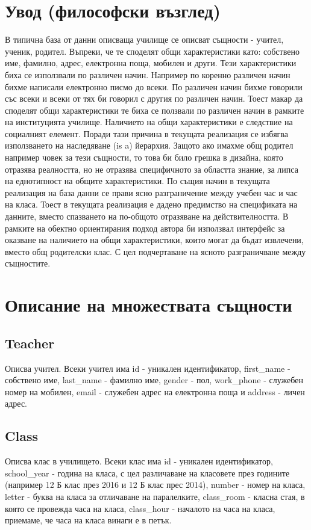 \documentclass[a4paper, 12pt, x11names]{article}
\begin{document}
\section{Увод (философски възглед)}
В типична база от данни описваща училище се описват същности - учител, ученик, родител.
Въпреки, че те споделят общи характеристики като: собствено име, фамилно, адрес, електронна поща, мобилен и други.
Тези характеристики биха се използвали по различен начин.
Например по коренно различен начин бихме написали електронно писмо до всеки.
По различен начин бихме говорили със всеки и всеки от тях би говорил с другия по различен начин.
Тоест макар да споделят общи характеристики те биха се ползвали по различен начин в рамките на институцията училище.
Наличието на общи характеристики е следствие на социалният елемент.
Поради тази причина в текущата реализация се избягва използването на наследяване (is a) йерархия.
Защото ако имахме общ родител например човек за тези същности, то това би било грешка в дизайна, която отразява реалността,
но не отразява специфичното за областта знание, за липса на еднотипност на общите характеристики.
По същия начин в текущата реализация на база данни се прави ясно разграничение между учебен час и час на класа.
Тоест в текущата реализация е дадено предимство на спецификата на данните,
вместо спазването на по-общото отразяване на действителността.
В рамките на обектно ориентирания подход автора би използвал интерфейс за оказване на наличието на общи характеристики,
които могат да бъдат извлечени, вместо общ родителски клас. С цел подчертаване на ясното разграничване между същностите.
\section{Описание на множествата същности}
\subsection{Teacher}
Описва учител. Всеки учител има id - уникален идентификатор,
first\_name - собствено име, last\_name - фамилно име,
gender - пол, work\_phone - служебен номер на мобилен,
email - служебен адрес на електронна поща и address - личен адрес.
\subsection{Class}
Описва клас в училището. Всеки клас има id - уникален идентификатор,
school\_year - година на класа,
с цел различаване на класовете през годините (например 12 Б клас през 2016 и 12 Б клас прес 2014),
number - номер на класа, letter - буква на класа за отличаване на паралелките,
class\_room - класна стая, в която се провежда часа на класа,
class\_hour - началото на часа на класа, приемаме, че часа на класа винаги е в петък.
\end{document}
